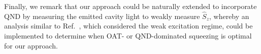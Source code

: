 Finally, we remark that our approach could be naturally extended to incorporate QND by measuring the emitted cavity light to weakly measure $\hat S_z$, whereby an analysis similar to Ref.~\cite{Barberena2023b}, which considered the weak excitation regime, could be implemented to determine when OAT- or QND-dominated squeezing is optimal for our approach. 

